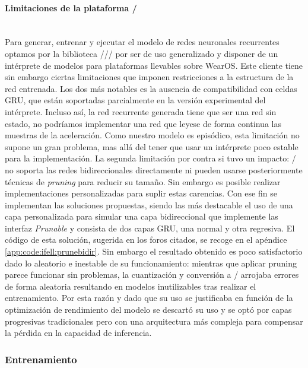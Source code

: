 \paragraph{Limitaciones de la plataforma \tflite/}\label{par:desc:modelo:rnn:limitaciones}\\
Para generar, entrenar y ejecutar el modelo de redes neuronales recurrentes optamos por la biblioteca \tensorflow//\tflite/ por ser de uso generalizado y disponer de un intérprete de modelos para plataformas llevables sobre WearOS. Este cliente tiene sin embargo ciertas limitaciones que imponen restricciones a la estructura de la red entrenada. Los dos más notables es la ausencia de compatibilidad con celdas GRU\cite{tfliteGru}, que están soportadas parcialmente en la versión experimental del intérprete. Incluso así, la red recurrente generada tiene que ser una red sin estado, no podríamos implementar una red que leyese de forma continua las muestras de la aceleración. Como nuestro modelo es episódico, esta limitación no supone un gran problema, mas allá del tener que usar un intérprete poco estable para la implementación. 
La segunda limitación por contra si tuvo un impacto: \tflite/ no soporta las redes bidireccionales directamente\cite{tfliteBidir} ni pueden usarse posteriormente técnicas de \textit{pruning} para reducir su tamaño\cite{tfPruneBidir}. Sin embargo es posible realizar implementaciones personalizadas para suplir estas carencias. Con ese fin se implementan las soluciones propuestas, siendo las más destacable el uso de una capa personalizada para simular una capa bidireccional que implemente las interfaz \textit{Prunable} y consista de dos capas GRU, una normal y otra regresiva. El código de esta solución, sugerida en los foros citados, se recoge en el apéndice \ref{app:code:ifell:prunebidir}. Sin embargo el resultado obtenido es poco satisfactorio dado lo aleatorio e inestable de su funcionamiento: mientras que aplicar pruning parece funcionar sin problemas, la cuantización y conversión a \tflite/ arrojaba errores de forma aleatoria resultando en modelos inutilizables tras realizar el entrenamiento. Por esta razón y dado que su uso se justificaba en función de la optimización de rendimiento del modelo se descartó su uso y se optó por capas progresivas tradicionales pero con una arquitectura más compleja para compensar la pérdida en la capacidad de inferencia.

\subsubsection{Entrenamiento}

